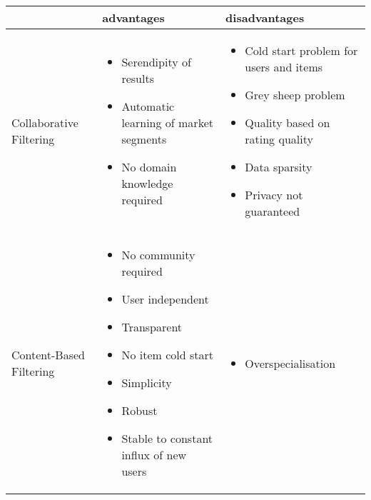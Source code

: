 \begin{table}
    \begin{center}
        \begin{tabularx}{\columnwidth}{X|X|X}
            & advantages & disadvantages \\
            \hline
            Collaborative Filtering 
            &   \begin{itemize}[noitemsep,topsep=0pt,parsep=0pt,partopsep=0pt, leftmargin=3.5mm]
                    \item Serendipity of results 
                    \item Automatic learning of market segments
                    \item No domain knowledge required
                \end{itemize}
            &   \begin{itemize}[noitemsep,topsep=0pt,parsep=0pt,partopsep=0pt, leftmargin=3.5mm]
                    \item Cold start problem for users and items
                    \item Grey sheep problem
                    \item Quality based on rating quality
                    \item Data sparsity
                    \item Privacy not guaranteed
                \end{itemize} \\
            \hline
            Content-Based Filtering 
            &   \begin{itemize}[noitemsep,topsep=0pt,parsep=0pt,partopsep=0pt, leftmargin=3.5mm]
                    \item No community required 
                    \item User independent
                    \item Transparent
                    \item No item cold start
                    \item Simplicity
                    \item Robust
                    \item Stable to constant influx of new users
                \end{itemize}
            &   \begin{itemize}[noitemsep,topsep=0pt,parsep=0pt,partopsep=0pt, leftmargin=3.5mm]
                    \item Overspecialisation

\end{itemize}
\end{tabularx}
\end{center}
\end{table}
